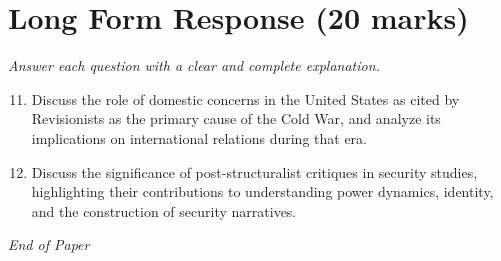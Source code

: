 \documentclass[12pt]{article}
\begin{document}
\section*{Long Form Response (20 marks)}
\textit{Answer each question with a clear and complete explanation.}
\begin{enumerate}[label=\arabic*.]
\setcounter{enumi}{10}
\item Discuss the role of domestic concerns in the United States as cited by Revisionists as the primary cause of the Cold War, and analyze its implications on international relations during that era.
\item Discuss the significance of post-structuralist critiques in security studies, highlighting their contributions to understanding power dynamics, identity, and the construction of security narratives.
\end{enumerate}

\vfill
\noindent\textit{End of Paper}
\end{document}
